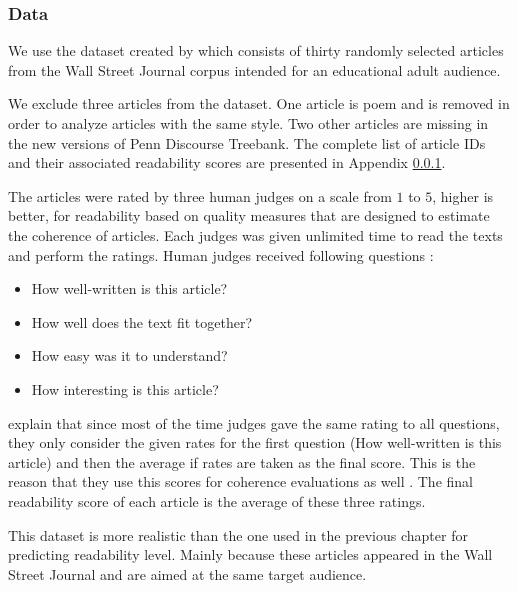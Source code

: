 \subsubsection{Data}
%
We use the dataset created by  which consists of thirty randomly selected articles from the Wall Street Journal corpus intended for an educational adult audience. 

We exclude three articles from the dataset. 
One article is poem and is removed in order to analyze articles with the same style. 
Two other articles are missing in the new versions of Penn Discourse Treebank.
The complete list of article IDs and their associated readability scores are presented in Appendix \ref{}.


The articles were rated by three human judges on a scale from $1$ to $5$, higher is better, for readability based on quality measures that are designed to estimate the coherence of articles. 
Each judges was given unlimited time to read the texts and perform the ratings. 
Human judges received following questions \cite{pitler08}:
\begin{itemize}
	\item How well-written is this article?
	\item How well does the text fit together?
	\item How easy was it to understand?
	\item How interesting is this article?
\end{itemize} 
 
 explain that since most of the time judges gave the same rating to all questions, they only consider the given rates for the first question (How well-written is this article) and then the average if rates are taken as the final score. 
This is the reason that they use this scores for coherence evaluations as well \cite{pitler08}.  
The final readability score of each article is the average of these three ratings.

This dataset is more realistic than the one used in the previous chapter for predicting readability level.  
Mainly because these articles appeared in the Wall Street Journal and are aimed at the same target audience. 

